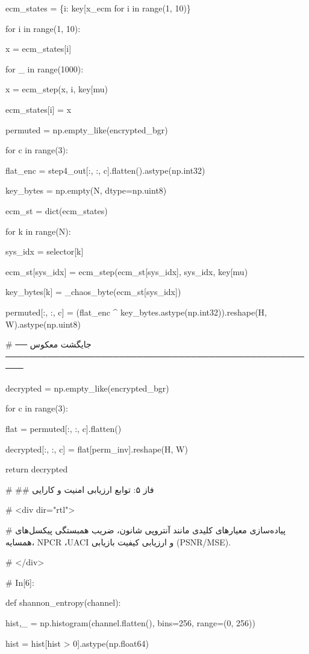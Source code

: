 ecm\_states = \{i: key{[}\textquotesingle x\_ecm\textquotesingle{]} for i in range(1, 10)\}

for i in range(1, 10):

x = ecm\_states{[}i{]}

for \_ in range(1000):

x = ecm\_step(x, i, key{[}\textquotesingle mu\textquotesingle{]})

ecm\_states{[}i{]} = x

permuted = np.empty\_like(encrypted\_bgr)

for c in range(3):

flat\_enc = step4\_out{[}:, :, c{]}.flatten().astype(np.int32)

key\_bytes = np.empty(N, dtype=np.uint8)

ecm\_st = dict(ecm\_states)

for k in range(N):

sys\_idx = selector{[}k{]}

ecm\_st{[}sys\_idx{]} = ecm\_step(ecm\_st{[}sys\_idx{]}, sys\_idx, key{[}\textquotesingle mu\textquotesingle{]})

key\_bytes{[}k{]} = \_chaos\_byte(ecm\_st{[}sys\_idx{]})

permuted{[}:, :, c{]} = (flat\_enc \^{} key\_bytes.astype(np.int32)).reshape(H, W).astype(np.uint8)

\# ── جایگشت معکوس ─────────────────────────────────────────────────────

decrypted = np.empty\_like(encrypted\_bgr)

for c in range(3):

flat = permuted{[}:, :, c{]}.flatten()

decrypted{[}:, :, c{]} = flat{[}perm\_inv{]}.reshape(H, W)

return decrypted

\# \#\# فاز ۵: توابع ارزیابی امنیت و کارایی

\# \textless div dir="rtl"\textgreater{}

\# پیاده‌سازی معیارهای کلیدی مانند آنتروپی شانون، ضریب همبستگی پیکسل‌های همسایه، NPCR ،UACI و ارزیابی کیفیت بازیابی (PSNR/MSE).

\# \textless/div\textgreater{}

\# In{[}6{]}:

def shannon\_entropy(channel):

hist,\_ = np.histogram(channel.flatten(), bins=256, range=(0, 256))

hist = hist{[}hist \textgreater{} 0{]}.astype(np.float64)

